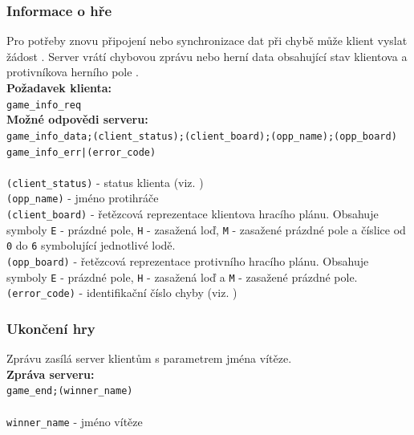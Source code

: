 \documentclass[12pt, a4paper]{article} %
\begin{document}
	\subsubsection{Informace o hře}
	\par Pro potřeby znovu připojení nebo synchronizace dat při chybě může klient vyslat žádost . Server vrátí chybovou zprávu  nebo herní data obsahující stav klientova a protivníkova herního pole .
	\\
	\textbf{Požadavek klienta:}\\
	\texttt{game\_info\_req}\\
	\textbf{Možné odpovědi serveru:}\\
	\texttt{game\_info\_data;(client\_status);(client\_board);(opp\_name);(opp\_board)}\\
	\texttt{game\_info\_err|(error\_code)}\\\\
	\texttt{(client\_status)} - status klienta (viz. )\\
	\texttt{(opp\_name)} - jméno protihráče\\
	\texttt{(client\_board)} - řetězcová reprezentace klientova hracího plánu. Obsahuje symboly \texttt{E} - prázdné pole, \texttt{H} - zasažená loď, \texttt{M} - zasažené prázdné pole a číslice od \texttt{0} do \texttt{6} symbolující jednotlivé lodě.\\
	\texttt{(opp\_board)} - řetězcová reprezentace protivního hracího plánu. Obsahuje symboly \texttt{E} - prázdné pole, \texttt{H} - zasažená loď a \texttt{M} - zasažené prázdné pole.\\
	\texttt{(error\_code)} - identifikační číslo chyby (viz. )
	
	\subsubsection{Ukončení hry}
	\par Zprávu zasílá server klientům s parametrem jména vítěze.\\
	\textbf{Zpráva serveru:}\\
	\texttt{game\_end;(winner\_name)}\\\\
	\texttt{winner\_name} - jméno vítěze
\end{document}
